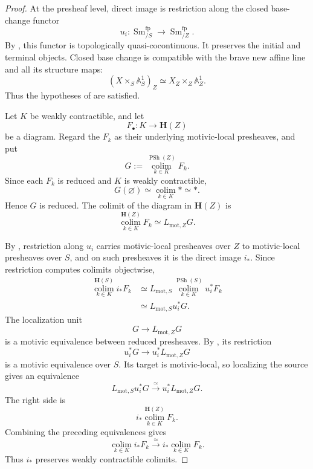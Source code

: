 \begin{proof}
At the presheaf level, direct image is restriction along the closed
base-change functor
\[
    u_i
    \colon
    \operatorname{Sm}^{\mathrm{fp}}_{/S}
    \longrightarrow
    \operatorname{Sm}^{\mathrm{fp}}_{/Z}.
\]
By
,
this functor is topologically quasi-cocontinuous.  It preserves the
initial and terminal objects.  Closed base change is compatible with
the brave new affine line and all its structure maps:
\[
    (X\times_S\mathbb A^1_S)_Z
    \simeq
    X_Z\times_Z\mathbb A^1_Z.
\]
Thus the hypotheses of
are satisfied.

Let \(K\) be weakly contractible, and let
\[
    F_\bullet
    \colon
    K
    \longrightarrow
    \mathbf H(Z)
\]
be a diagram.  Regard the \(F_k\) as their underlying motivic-local
presheaves, and put
\[
    G
    :=
    \operatorname*{colim}_{k\in K}^{\operatorname{PSh}(Z)}F_k.
\]
Since each \(F_k\) is reduced and \(K\) is weakly contractible,
\[
    G(\varnothing)
    \simeq
    \operatorname*{colim}_{k\in K}*
    \simeq
    *.
\]
Hence \(G\) is reduced.  The colimit of the diagram in
\(\mathbf H(Z)\) is
\[
    \operatorname*{colim}_{k\in K}^{\mathbf H(Z)}F_k
    \simeq
    L_{\mathrm{mot},Z}G.
\]

By
,
restriction along \(u_i\) carries motivic-local presheaves over \(Z\)
to motivic-local presheaves over \(S\), and on such presheaves it is the
direct image \(i_*\).  Since restriction computes colimits objectwise,
\[
\begin{aligned}
    \operatorname*{colim}_{k\in K}^{\mathbf H(S)}i_*F_k
    &\simeq
    L_{\mathrm{mot},S}
    \operatorname*{colim}_{k\in K}^{\operatorname{PSh}(S)}u_i^*F_k
    \\
    &\simeq
    L_{\mathrm{mot},S}u_i^*G.
\end{aligned}
\]
The localization unit
\[
    G
    \longrightarrow
    L_{\mathrm{mot},Z}G
\]
is a motivic equivalence between reduced presheaves.  By
, its restriction
\[
    u_i^*G
    \longrightarrow
    u_i^*L_{\mathrm{mot},Z}G
\]
is a motivic equivalence over \(S\).  Its target is motivic-local, so
localizing the source gives an equivalence
\[
    L_{\mathrm{mot},S}u_i^*G
    \xrightarrow{\simeq}
    u_i^*L_{\mathrm{mot},Z}G.
\]
The right side is
\[
    i_*
    \operatorname*{colim}_{k\in K}^{\mathbf H(Z)}F_k.
\]
Combining the preceding equivalences gives
\[
    \operatorname*{colim}_{k\in K}i_*F_k
    \xrightarrow{\simeq}
    i_*
    \operatorname*{colim}_{k\in K}F_k.
\]
Thus \(i_*\) preserves weakly contractible colimits.
\end{proof}

